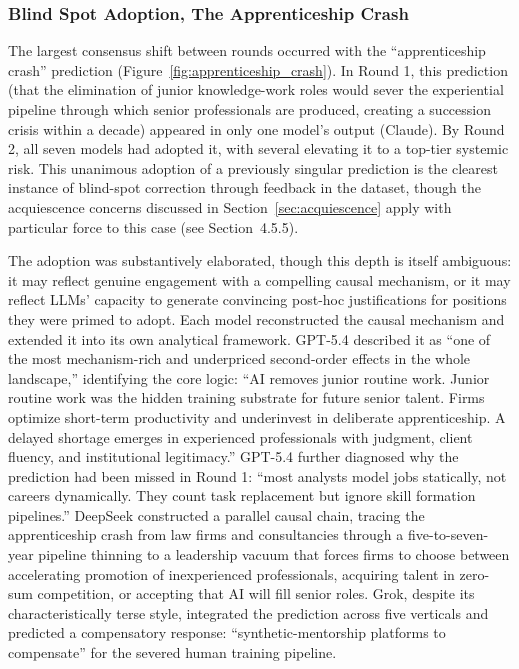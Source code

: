 \documentclass[preprint,review,12pt]{elsarticle}
\begin{document}
\subsubsection{Blind Spot Adoption, The Apprenticeship Crash}
\label{sec:blind_spot_adoption}

The largest consensus shift between rounds occurred with the ``apprenticeship crash'' prediction (Figure~\ref{fig:apprenticeship_crash}). In Round 1, this prediction (that the elimination of junior knowledge-work roles would sever the experiential pipeline through which senior professionals are produced, creating a succession crisis within a decade) appeared in only one model's output (Claude). By Round 2, all seven models had adopted it, with several elevating it to a top-tier systemic risk. This unanimous adoption of a previously singular prediction is the clearest instance of blind-spot correction through feedback in the dataset, though the acquiescence concerns discussed in Section~\ref{sec:acquiescence} apply with particular force to this case (see Section~4.5.5).

The adoption was substantively elaborated, though this depth is itself ambiguous: it may reflect genuine engagement with a compelling causal mechanism, or it may reflect LLMs' capacity to generate convincing post-hoc justifications for positions they were primed to adopt. Each model reconstructed the causal mechanism and extended it into its own analytical framework. GPT-5.4 described it as ``one of the most mechanism-rich and underpriced second-order effects in the whole landscape,'' identifying the core logic: ``AI removes junior routine work. Junior routine work was the hidden training substrate for future senior talent. Firms optimize short-term productivity and underinvest in deliberate apprenticeship. A delayed shortage emerges in experienced professionals with judgment, client fluency, and institutional legitimacy.'' GPT-5.4 further diagnosed why the prediction had been missed in Round 1: ``most analysts model jobs statically, not careers dynamically. They count task replacement but ignore skill formation pipelines.'' DeepSeek constructed a parallel causal chain, tracing the apprenticeship crash from law firms and consultancies through a five-to-seven-year pipeline thinning to a leadership vacuum that forces firms to choose between accelerating promotion of inexperienced professionals, acquiring talent in zero-sum competition, or accepting that AI will fill senior roles. Grok, despite its characteristically terse style, integrated the prediction across five verticals and predicted a compensatory response: ``synthetic-mentorship platforms to compensate'' for the severed human training pipeline.
\end{document}
